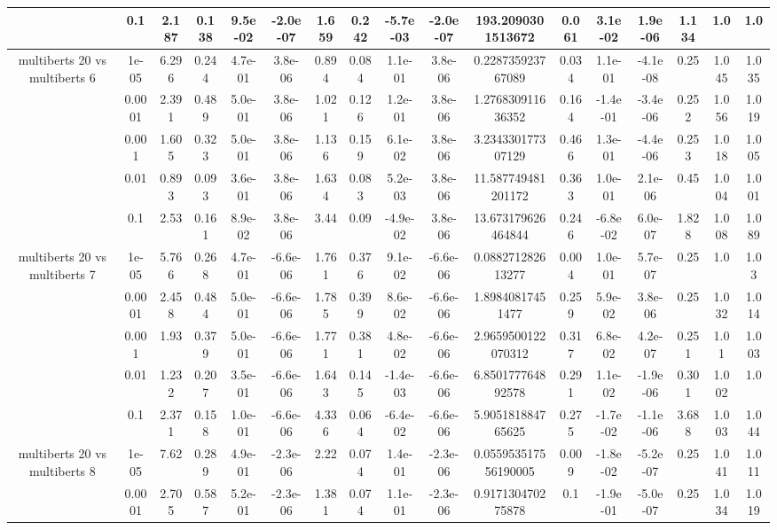 \begin{tabular}{|c|c|c|c|c|c|c|c|c|c|c|c|c|c|c|c|c|}
 & 0.1 & 2.187 & 0.138 & 9.5e-02 & -2.0e-07 & 1.659 & 0.242 & -5.7e-03 & -2.0e-07 & 193.2090301513672 & 0.061 & 3.1e-02 & 1.9e-06 & 1.134 & 1.0 & 1.0 \\
\hline
\multirow{5}{*}{multiberts 20 vs multiberts 6} & 1e-05 & 6.296 & 0.244 & 4.7e-01 & 3.8e-06 & 0.894 & 0.084 & 1.1e-01 & 3.8e-06 & 0.228735923767089 & 0.034 & 1.1e-01 & -4.1e-08 & 0.25 & 1.045 & 1.035 \\
 & 0.0001 & 2.391 & 0.489 & 5.0e-01 & 3.8e-06 & 1.021 & 0.126 & 1.2e-01 & 3.8e-06 & 1.276830911636352 & 0.164 & -1.4e-01 & -3.4e-06 & 0.252 & 1.056 & 1.019 \\
 & 0.001 & 1.605 & 0.323 & 5.0e-01 & 3.8e-06 & 1.136 & 0.159 & 6.1e-02 & 3.8e-06 & 3.234330177307129 & 0.466 & 1.3e-01 & -4.4e-06 & 0.253 & 1.018 & 1.005 \\
 & 0.01 & 0.893 & 0.093 & 3.6e-01 & 3.8e-06 & 1.634 & 0.083 & 5.2e-03 & 3.8e-06 & 11.587749481201172 & 0.363 & 1.0e-01 & 2.1e-06 & 0.45 & 1.004 & 1.001 \\
 & 0.1 & 2.53 & 0.161 & 8.9e-02 & 3.8e-06 & 3.44 & 0.09 & -4.9e-02 & 3.8e-06 & 13.673179626464844 & 0.246 & -6.8e-02 & 6.0e-07 & 1.828 & 1.008 & 1.089 \\
\hline
\multirow{5}{*}{multiberts 20 vs multiberts 7} & 1e-05 & 5.766 & 0.268 & 4.7e-01 & -6.6e-06 & 1.761 & 0.376 & 9.1e-02 & -6.6e-06 & 0.088271282613277 & 0.004 & 1.0e-01 & 5.7e-07 & 0.25 & 1.0 & 1.03 \\
 & 0.0001 & 2.458 & 0.484 & 5.0e-01 & -6.6e-06 & 1.785 & 0.399 & 8.6e-02 & -6.6e-06 & 1.89840817451477 & 0.259 & 5.9e-02 & 3.8e-06 & 0.25 & 1.032 & 1.014 \\
 & 0.001 & 1.93 & 0.379 & 5.0e-01 & -6.6e-06 & 1.771 & 0.381 & 4.8e-02 & -6.6e-06 & 2.9659500122070312 & 0.317 & 6.8e-02 & 4.2e-07 & 0.251 & 1.01 & 1.003 \\
 & 0.01 & 1.232 & 0.207 & 3.5e-01 & -6.6e-06 & 1.643 & 0.145 & -1.4e-03 & -6.6e-06 & 6.850177764892578 & 0.291 & 1.1e-02 & -1.9e-06 & 0.301 & 1.002 & 1.0 \\
 & 0.1 & 2.371 & 0.158 & 1.0e-01 & -6.6e-06 & 4.336 & 0.064 & -6.4e-02 & -6.6e-06 & 5.905181884765625 & 0.275 & -1.7e-02 & -1.1e-06 & 3.688 & 1.003 & 1.044 \\
\hline
\multirow{5}{*}{multiberts 20 vs multiberts 8} & 1e-05 & 7.62 & 0.289 & 4.9e-01 & -2.3e-06 & 2.22 & 0.074 & 1.4e-01 & -2.3e-06 & 0.055953517556190005 & 0.009 & -1.8e-02 & -5.2e-07 & 0.25 & 1.041 & 1.011 \\
 & 0.0001 & 2.705 & 0.587 & 5.2e-01 & -2.3e-06 & 1.381 & 0.074 & 1.1e-01 & -2.3e-06 & 0.917130470275878 & 0.1 & -1.9e-01 & -5.0e-07 & 0.25 & 1.034 & 1.019 \\

\end{tabular}
